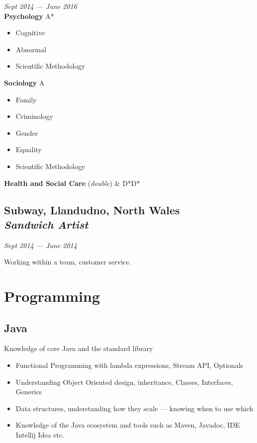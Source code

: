 \documentclass[a4paper, 13pt, draft]{article}
\newcommand{\timeperiod}[2]{%
    \textit{\small{#1 --- #2}}
}
\newcommand{\proglang}[1]{%
    \subsection*{#1}
}
\begin{document}
\begin{multicols}{2}
    \timeperiod{Sept 2014}{June 2016} \\

    \textbf{Psychology} A*

    \begin{itemize}		
	\setlength\itemsep{0em}
    \item Cognitive
    \item Abnormal
    \item Scientific Methodology 
\end{itemize}		

\textbf{Sociology} A

\begin{itemize}		
    \setlength\itemsep{0em}
\item Family
\item Criminology
\item Gender
\item Equality
\item Scientific Methodology
\end{itemize}		

\textbf{Health and Social Care} (\textit{double}) & D*D*

\subsection*{Subway, \small{Llandudno, North Wales} \\\emph{Sandwich Artist}}

\timeperiod{Sept 2014}{June 2014}

Working within a team, customer service.

\end{multicols}

\section*{\Large{Programming}}

    \proglang{Java}

    Knowledge of core Java and the standard library

    \begin{itemize}
	\setlength\itemsep{0em}
    \item
	Functional Programming with lambda expressions, Stream API, Optionals
    \item
	Understanding Object Oriented design, inheritance, Classes,
	Interfaces, Generics
    \item
	Data structures, understanding how they scale --- knowing when to use which
    \item
	Knowledge of the Java ecosystem and tools such as Maven, Javadoc, IDE
	Intellij Idea etc. 
\end{itemize}
\end{document}
